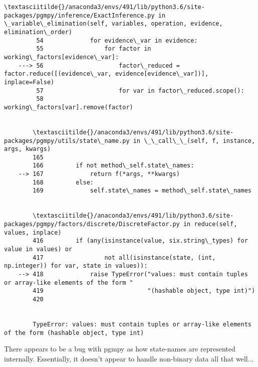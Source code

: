 \documentclass[11pt]{article}
\begin{document}
\begin{Verbatim}[commandchars=\\\{\}]
        \textasciitilde{}/anaconda3/envs/491/lib/python3.6/site-packages/pgmpy/inference/ExactInference.py in \_variable\_elimination(self, variables, operation, evidence, elimination\_order)
         54             for evidence\_var in evidence:
         55                 for factor in working\_factors[evidence\_var]:
    ---> 56                     factor\_reduced = factor.reduce([(evidence\_var, evidence[evidence\_var])], inplace=False)
         57                     for var in factor\_reduced.scope():
         58                         working\_factors[var].remove(factor)


        \textasciitilde{}/anaconda3/envs/491/lib/python3.6/site-packages/pgmpy/utils/state\_name.py in \_\_call\_\_(self, f, instance, args, kwargs)
        165 
        166         if not method\_self.state\_names:
    --> 167             return f(*args, **kwargs)
        168         else:
        169             self.state\_names = method\_self.state\_names


        \textasciitilde{}/anaconda3/envs/491/lib/python3.6/site-packages/pgmpy/factors/discrete/DiscreteFactor.py in reduce(self, values, inplace)
        416         if (any(isinstance(value, six.string\_types) for value in values) or
        417                 not all(isinstance(state, (int, np.integer)) for var, state in values)):
    --> 418             raise TypeError("values: must contain tuples or array-like elements of the form "
        419                             "(hashable object, type int)")
        420 


        TypeError: values: must contain tuples or array-like elements of the form (hashable object, type int)

    \end{Verbatim}

    There appears to be a bug with pgmpy as how state-names are represented
internally. Essentially, it doesn't appear to handle non-binary data all
that well...


    
    
    
    
\end{document}
